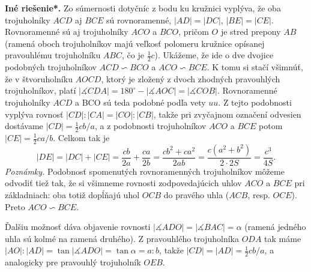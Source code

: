 \documentclass{article}
\newcommand{\ma}{\measuredangle}
\begin{document}
{\textbf{Iné riešenie*.} Zo súmernosti dotyčníc z bodu ku kružnici vyplýva, že oba trojuholníky $ACD$ aj $BCE$ sú rovnoramenné, $|AD| = |DC|$, $|BE| = |CE|$. Rovnoramenné sú aj trojuholníky $ACO$ a $BCO$, pričom $O$ je stred prepony $AB$ (ramená oboch trojuholníkov
majú veľkosť polomeru kružnice opísanej pravouhlému trojuholníku $ABC$, čo je $\frac{1}{2}c$). Ukážeme, že ide o dve dvojice podobných trojuholníkov $ACD \backsim BCO$ a $ACO \backsim BCE$. K tomu si stačí všimnúť, že v štvoruholníku $AOCD$, ktorý je zložený z dvoch zhodných pravouhlých trojuholníkov, platí $| \ma CDA| = 180^\circ -| \ma AOC| = |\ma COB|$. Rovnoramenné trojuholníky $ACD$ a BCO sú teda podobné podľa vety $uu$. Z tejto podobnosti vyplýva rovnosť $|CD| : |CA| = |CO| : |CB|$, takže pri zvyčajnom označení odvesien dostávame $|CD| = \frac{1}{2}cb/a$, a z podobnosti trojuholníkov $ACO$ a $BCE$ potom $|CE| = \frac{1}{2}ca/b$.
Celkom tak je
$$|DE| = |DC| + |CE| = \frac{cb}{2a}+\frac{ca}{2b}=\frac{cb^2 + ca^2}{2ab}= \frac{c(a^2 + b^2)}{2\cdot 2S}=\frac{c^3}{4S}.$$
\textit{Poznámky.} Podobnosť spomenutých rovnoramenných trojuholníkov môžeme odvodiť tiež tak, že si všimneme rovnosti zodpovedajúcich uhlov $ACO$ a $BCE$ pri
základniach: oba totiž dopĺňajú uhol $OCB$ do pravého uhla ($ACB$, resp. $OCE$). Preto
$ACO \backsim BCE$.

Ďalšiu možnosť dáva objavenie rovnosti $|\ma ADO| = |\ma BAC| = \alpha$ (ramená jedného
uhla sú kolmé na ramená druhého). Z  pravouhlého trojuholníka $ODA$ tak máme $|AO| 
: |AD| = \tan |\ma ADO| = \tan \alpha = a : b$, takže $|CD| = |AD| = \frac{1}{2}cb/a$, a analogicky pre pravouhlý trojuholník $OEB$.
}
\end{document}
